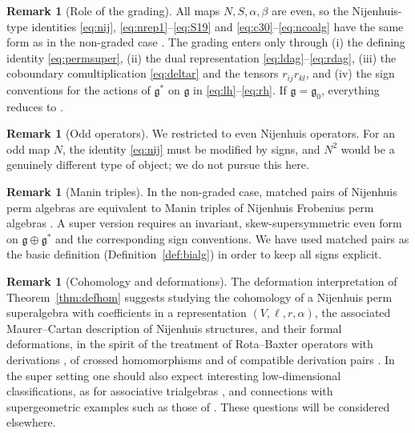 \documentclass[11pt]{article}
\theoremstyle{definition}
\newtheorem{remark}[theorem]{Remark}
\newcommand{\g}{\mathfrak{g}}
\begin{document}
\begin{remark}[Role of the grading]
All maps $N,S,\alpha,\beta$ are even, so the Nijenhuis-type identities \eqref{eq:nij}, \eqref{eq:nrep1}--\eqref{eq:S19} and \eqref{eq:c30}--\eqref{eq:ncoalg} have the same form as in the non-graded case \cite{MS}. The grading enters only through (i) the defining identity \eqref{eq:permsuper}, (ii) the dual representation \eqref{eq:ldag}--\eqref{eq:rdag}, (iii) the coboundary comultiplication \eqref{eq:deltar} and the tensors $r_{ij}r_{kl}$, and (iv) the sign conventions for the actions of $\g^*$ on $\g$ in \eqref{eq:lh}--\eqref{eq:rh}. If $\g=\g_0$, everything reduces to \cite{MS}.
\end{remark}

\begin{remark}[Odd operators]
We restricted to even Nijenhuis operators. For an odd map $N$, the identity \eqref{eq:nij} must be modified by signs, and $N^2$ would be a genuinely different type of object; we do not pursue this here.
\end{remark}

\begin{remark}[Manin triples]
In the non-graded case, matched pairs of Nijenhuis perm algebras are equivalent to Manin triples of Nijenhuis Frobenius perm algebras \cite{MS}. A super version requires an invariant, skew-supersymmetric even form on $\g\oplus\g^*$ and the corresponding sign conventions. We have used matched pairs as the basic definition (Definition~\ref{def:bialg}) in order to keep all signs explicit.
\end{remark}

\begin{remark}[Cohomology and deformations]
The deformation interpretation of Theorem~\ref{thm:defhom} suggests studying the cohomology of a Nijenhuis perm superalgebra with coefficients in a representation $(V,\ell,r,\alpha)$, the associated Maurer--Cartan description of Nijenhuis structures, and their formal deformations, in the spirit of the treatment of Rota--Baxter operators with derivations \cite{imed-rb}, of crossed homomorphisms \cite{basdouri-crossed} and of compatible derivation pairs \cite{imed-maurer}. In the super setting one should also expect interesting low-dimensional classifications, as for associative trialgebras \cite{MBZ}, and connections with supergeometric examples such as those of \cite{bb1,bbbbk1}. These questions will be considered elsewhere.
\end{remark}

\appendix
\end{document}
